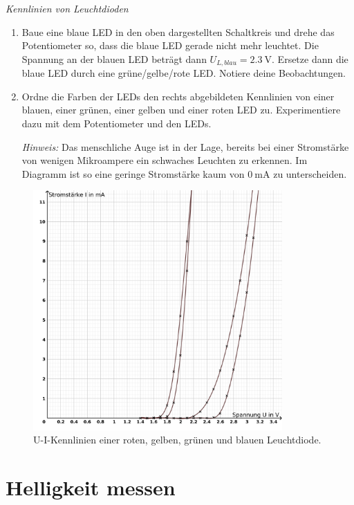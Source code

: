\begin{aufgabe} \emph{Kennlinien von Leuchtdioden}
	\begin{enumerate}[label=\alph*), itemsep=0mm, parsep=0mm]
		\item Baue eine blaue LED in den oben dargestellten Schaltkreis und drehe das Potentiometer so, dass die blaue LED gerade nicht mehr leuchtet. Die Spannung an der blauen LED beträgt dann $U_{L,blau}=\SI{2,3}{\volt}$. Ersetze dann die blaue LED durch eine grüne/gelbe/rote LED. Notiere deine Beobachtungen.
		\item Ordne die Farben der LEDs den rechts abgebildeten Kennlinien von einer blauen, einer grünen, einer gelben und einer roten LED zu. Experimentiere dazu mit dem Potentiometer und den LEDs.
		
		\emph{Hinweis:} Das menschliche Auge ist in der Lage, bereits bei einer Stromstärke von wenigen Mikroampere ein schwaches Leuchten zu erkennen. Im Diagramm ist so eine geringe Stromstärke kaum von $\SI{0}{\milli\ampere}$ zu unterscheiden.
	\end{enumerate}
	
	\begin{figure}[H]
		\centering
		\includegraphics[width=0.85\textwidth]{./Zeichnungen/Diodenkennlinien.png}
		\caption{U-I-Kennlinien einer roten, gelben, grünen und blauen Leuchtdiode.}
	\end{figure}
\end{aufgabe}
\vfill

\section{Helligkeit messen}
\label{sec:helligkeit}

